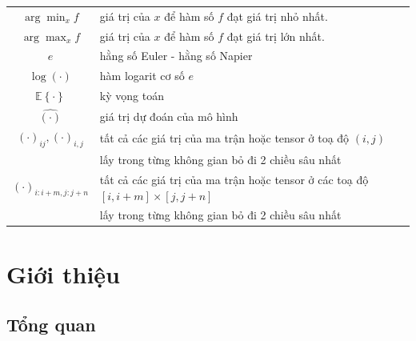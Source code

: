 \documentclass[a4paper, 12pt]{report}
\begin{document}
\begin{center}
\begin{tabular}{c|l}
    $\displaystyle \arg\min_xf$ & giá trị của $x$ để hàm số $f$ đạt giá trị nhỏ nhất.\\
    $\displaystyle \arg\max_xf$ & giá trị của $x$ để hàm số $f$ đạt giá trị lớn nhất.\\
    $e$ & hằng số Euler - hằng số Napier\\
    $\log\left(\cdot\right)$ & hàm logarit cơ số $e$\\
    $\mathbb{E}\left\{\cdot\right\}$ & kỳ vọng toán\\
    $\widehat{\left(\cdot\right)}$ & giá trị dự đoán của mô hình\\
    $\left(\cdot\right)_{ij}, \left(\cdot\right)_{i, j}$ & tất cả các giá trị của ma trận hoặc tensor ở toạ độ $(i, j)$\\
    & lấy trong từng không gian bỏ đi 2 chiều sâu nhất\\
    $\left(\cdot\right)_{i:i + m, j:j + n}$ & tất cả các giá trị của ma trận hoặc tensor ở các toạ độ $[i, i + m] \times [j, j + n]$\\
    & lấy trong từng không gian bỏ đi 2 chiều sâu nhất\\
\end{tabular}
\end{center}


\newpage

\fancyfoot{} %
\fancyfoot[R]{\scriptsize \ttfamily {\thepage}/\pageref{LastPage}}


\chapter{Giới thiệu}

\section{Tổng quan}\label{overview}
\end{document}
